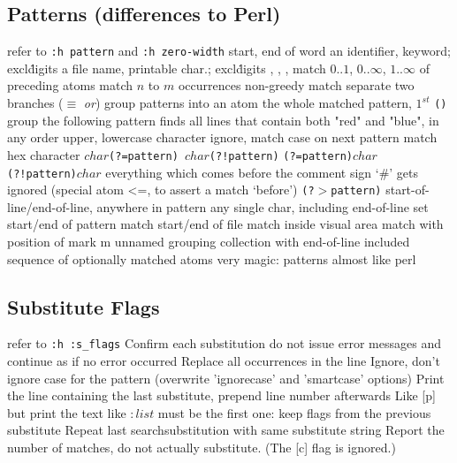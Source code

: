 \subsection{Patterns (differences to Perl)}	{refer to {\tt :h pattern} and {\tt :h zero-width} }
\cmdOper{\bs$<$ \bs$>$ }	{start, end of word}
	{an identifier, keyword; excl\. digits}
	{a file name, printable char.; excl\. digits}
	{, , \key{\enter}, \key{$\gets$}}
\cmdOper{\bs = * \bs + }	{match $0..1$, $0..\infty$, $1..\infty$ of preceding atoms}
	{match $n$ to $m$ occurrences}
\cmdOper{\bs$\{-\}$ }	{non-greedy match}
\cmdOper{\bs$|$ }	{separate two branches ($\equiv$ {\it or\/})}
\cmdOper{\bs( \bs) }	{group patterns into an atom}
	{the whole matched pattern, $1^{st}$ {\tt()} group}
	{the following pattern finds all lines that contain both "red" and "blue", in any order}
	{upper, lowercase character}
	{ignore, match case on next pattern}
	{match hex character}
	{\tt $char$(?=pattern) $char$(?!pattern)\rm}
	{\tt (?=pattern)$char$ (?!pattern)$char$\rm}
	{everything which comes before the
comment sign `\#' gets ignored (special atom \bs@<=, to assert a match `before')}
	{\tt (?$>$pattern)\rm }
\cmdOper{\bs\_\^{} \bs\_\$ }	{start-of-line/end-of-line, anywhere in pattern}
	{any single char, including end-of-line}
	{set start/end of pattern}
\cmdOper{\bs \%\^{} \bs\%\$ }	{match start/end of file}
	{match inside visual area}
	{match with position of mark m}
\cmdOper{\bs\%(\bs) }	{unnamed grouping}
\cmdOper{\bs\_$[$ $]$ }	{collection with end-of-line included}
\cmdOper{\bs\%$[$ $]$ }	{sequence of optionally matched atoms}
	{very magic: patterns almost like perl}

\subsection{Substitute Flags}	{refer to {\tt :h :s\_flags}}
	{Confirm each substitution}
	{ do not issue error messages and continue as if no error occurred}
	{Replace all occurrences in the line}
	{Ignore, don't ignore case for the pattern (overwrite 'ignorecase' and 'smartcase' options)}
	{Print the line containing the last substitute, prepend line number afterwards}
	{Like [p] but print the text like $:list$}
\cmdOper{\&}	{must be the first one: keep flags from the previous substitute}
	{Repeat last search\or substitution with same substitute string}
	{Report the number of matches, do not actually substitute.  (The [c] flag is ignored.) }

